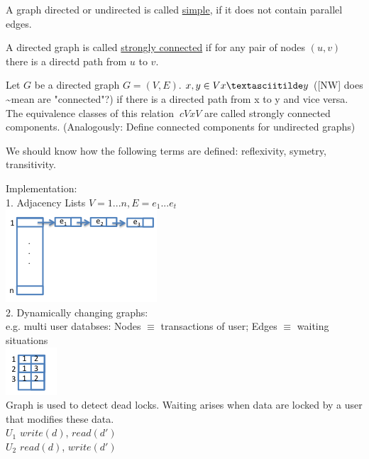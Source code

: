 \begin{definition}
    A graph directed or undirected is called \underline{simple}, if it does not contain parallel edges.
\end{definition}

\begin{definition}
        A directed graph is called \underline{strongly connected} if for any pair of nodes $(u,v)$ 
        there is a directd path from $u$ to $v$.
\end{definition}

Let $G$ be a directed graph $G = (V,E)$. $x,y \in V x \textasciitilde y$ ([NW] does \textasciitilde mean are "connected"?)
if there is a directed path from x to y and vice versa. \\

The equivalence classes of this relation $~c VxV$ are called strongly connected components.
(Analogously: Define connected components for undirected graphs)

\begin{information}
    We should know how the following terms are defined: reflexivity, symetry, transitivity.
\end{information}

Implementation: \\
1. Adjacency Lists $V = {1...n}, E = {e_{1}...e_{t}}$ \\
\includegraphics{diagrams/adjacency_list.png} \\
2. Dynamically changing graphs: \\
e.g. multi user databses: Nodes $\equiv$  transactions of user; Edges $\equiv$  waiting situations \\
\includegraphics{diagrams/dynamically_changing_graphs.png} \\
Graph is used to detect dead locks. Waiting arises when data are locked by a user that modifies these data. \\
$U_{1}$ $write(d)$, $read(d')$ \\
$U_{2}$ $read(d)$, $write(d')$

